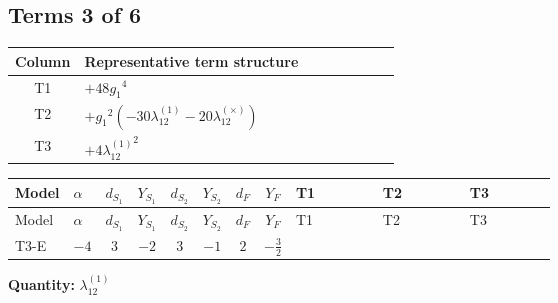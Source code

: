 \documentclass[8pt]{article}
\begin{document}
\begin{landscape}
\subsection*{Terms 3 of 6}
\begin{center}
\begin{tabular}{@{}c >{\raggedright\arraybackslash}p{0.82\linewidth}@{}}
\toprule
Column & Representative term structure \\
\midrule
T1 & \(\displaystyle +48 {g_1}^4\) \\
\midrule
T2 & \(\displaystyle +{g_1}^2 (-30 {\lambda_{12}^{(1)}}-20 {\lambda_{12}^{(\times)}})\) \\
\midrule
T3 & \(\displaystyle +4 {\lambda_{12}^{(1)}}^2\) \\
\midrule
\bottomrule
\end{tabular}
\end{center}
\smallskip
\tiny
\begin{longtable}{@{}llcccccc >{\raggedright\arraybackslash}p{0.21\linewidth} >{\raggedright\arraybackslash}p{0.21\linewidth} >{\raggedright\arraybackslash}p{0.21\linewidth}@{}}
\toprule
Model & $\alpha$ & $d_{S_1}$ & $Y_{S_1}$ & $d_{S_2}$ & $Y_{S_2}$ & $d_F$ & $Y_F$ & T1 & T2 & T3 \\
\midrule
\endfirsthead
\toprule
Model & $\alpha$ & $d_{S_1}$ & $Y_{S_1}$ & $d_{S_2}$ & $Y_{S_2}$ & $d_F$ & $Y_F$ & T1 & T2 & T3 \\
\midrule
\endhead
T3-E & $-4$ & $3$ & $-2$ & $3$ & $-1$ & $2$ & $-\frac{3}{2}$ & \scriptsize\adjustbox{max width=\linewidth}{$\begin{gathered} +48 {g_1}^4\end{gathered}$} & \scriptsize\adjustbox{max width=\linewidth}{$\begin{gathered} +{g_1}^2 (-30 {\lambda_{12}^{(1)}}-20 {\lambda_{12}^{(\times)}})\end{gathered}$} & \scriptsize\adjustbox{max width=\linewidth}{$\begin{gathered} +4 {\lambda_{12}^{(1)}}^2\end{gathered}$} \\
\midrule
\bottomrule
\end{longtable}
\clearpage
\noindent\textbf{Quantity: }$\lambda_{12}^{(1)}$\par\smallskip

\end{landscape}
\end{document}
